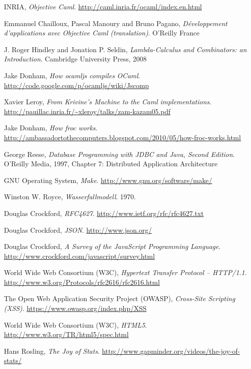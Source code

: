 \begin{thebibliography}{99}
INRIA,
\emph{Objective Caml}.
\url{http://caml.inria.fr/ocaml/index.en.html}

Emmanuel Chailloux, Pascal Manoury and Bruno Pagano,
\emph{Développement d'applications avec Objective Caml (translation)}.
O'Reilly France

J. Roger Hindley and Jonation P. Seldin,
\emph{Lambda-Calculus and Combinators: an Introduction}.
Cambridge University Press,
2008

Jake Donham,
\emph{How ocamljs compiles OCaml}.
\url{http://code.google.com/p/ocamljs/wiki/Jscomp}

Xavier Leroy,
\emph{From Krivine's Machine to the Caml implementations}.
\url{http://pauillac.inria.fr/~xleroy/talks/zam-kazam05.pdf}

Jake Donham,
\emph{How froc works}.
\url{http://ambassadortothecomputers.blogspot.com/2010/05/how-froc-works.html}

George Reese,
\emph{Database Programming with JDBC and Java, Second Edition}.
O'Reilly Media,
1997,
Chapter 7: Distributed Application Architecture

GNU Operating System,
\emph{Make}.
\url{http://www.gnu.org/software/make/}

Winston W. Royce,
\emph{Wasserfallmodell}.
1970.

Douglas Crockford,
\emph{RFC4627}.
\url{http://www.ietf.org/rfc/rfc4627.txt}

Douglas Crockford,
\emph{JSON}.
\url{http://www.json.org/}

Douglas Crockford,
\emph{A Survey of the JavaScript Programming Language}.
\url{http://www.crockford.com/javascript/survey.html}

World Wide Web Consortium (W3C),
\emph{Hypertext Transfer Protocol -- HTTP/1.1}.
\url{http://www.w3.org/Protocols/rfc2616/rfc2616.html}

The Open Web Application Security Project (OWASP),
\emph{Cross-Site Scripting (XSS)}.
\url{https://www.owasp.org/index.php/XSS}

World Wide Web Consortium (W3C),
\emph{HTML5}.
\url{http://www.w3.org/TR/html5/spec.html}

Hans Rosling,
\emph{The Joy of Stats}.
\url{http://www.gapminder.org/videos/the-joy-of-stats/}


\end{thebibliography}

